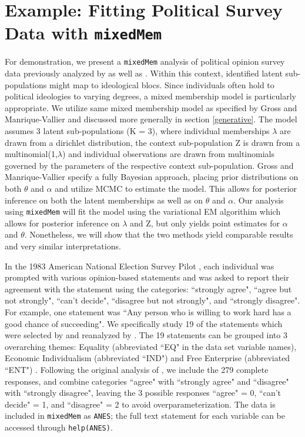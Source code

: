 \documentclass{article}\usepackage[]{graphicx}\usepackage[]{color}
\begin{document}
\section{Example: Fitting Political Survey Data with \texttt{mixedMem}}
For demonstration, we present a \texttt{mixedMem} analysis of political opinion survey data previously analyzed by  \cite{grossManriqueVallier} as well as \cite{feldman1988structure}. Within this context, identified latent sub-populations might map to ideological blocs. Since individuals often hold to political ideologies to varying degrees, a mixed membership model is particularly appropriate. We utilize same mixed membership model as specified by Gross and Manrique-Vallier and discussed more generally in section \ref{generative}. The model assumes 3 latent sub-populations (K = 3), where individual memberships $\lambda$ are drawn from a dirichlet distribution, the context sub-population Z is drawn from a multinomial(1,$\lambda$) and individual observations are drawn from multinomials governed by the parameters of the respective context sub-population. Gross and Manrique-Vallier specify a fully Bayesian approach, placing prior distributions on both $\theta$ and $\alpha$ and utilize MCMC to estimate the model. This allows for posterior inference on both the latent memberships as well as on $\theta$ and $\alpha$. Our analysis using \texttt{mixedMem} will fit the model using the variational EM algorithim  which allows for posterior inference on $\lambda$ and Z, but only yields point estimates for $\alpha$ and $\theta$. Nonetheless, we will show that the two methods yield comparable results and very similar interpretations.

In the 1983 American National Election Survey Pilot \citep{ANES}, each individual was prompted with various opinion-based statements and was asked to report their agreement with the statement using the categories: ``strongly agree", ``agree but not strongly", ``can't decide", ``disagree but not strongly", and ``strongly disagree". For example, one statement was ``Any person who is willing to work hard has a good chance of succeeding". We specifically study 19 of the statements which were selected by \cite{feldman1988structure} and reanalyzed by \citep{grossManriqueVallier}.  The 19 statements can be grouped into 3 overarching themes: Equality (abbreviated ``EQ" in the data set variable names), Economic Individualism (abbreviated ``IND") and Free Enterprise (abbreviated ``ENT") \citep{feldman1988structure}.  Following the original analysis of \cite{grossManriqueVallier}, we include the 279 complete responses, and combine categories ``agree" with ``strongly agree" and ``disagree"  with ``strongly disagree", leaving the 3 possible responses ``agree" = 0, ``can't decide" = 1, and ``disagree" = 2 to avoid overparameterization. The data is included in \texttt{mixedMem} as \texttt{ANES}; the full text statement for each variable can be accessed through \texttt{help(ANES)}. 
\end{document}

